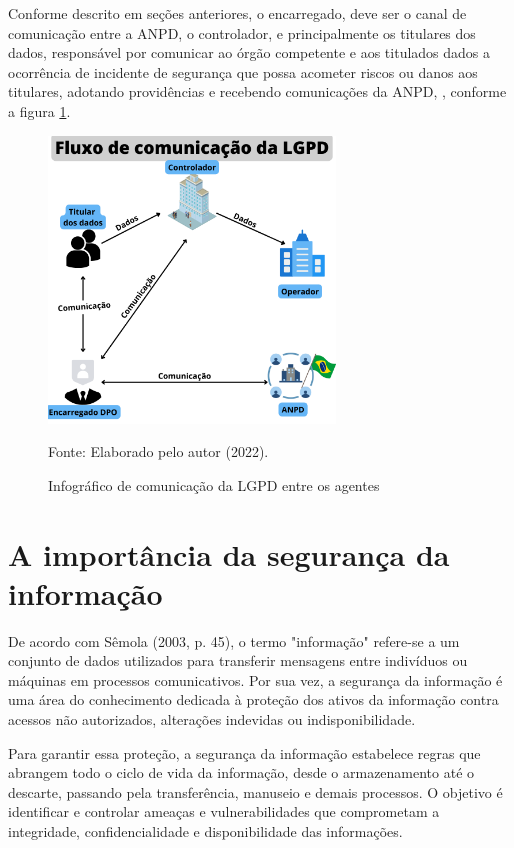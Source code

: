 \documentclass[
	12pt,				%
	openright,			%
	oneside,			%
	a4paper,			%
	english,			%
	french,				%
	spanish,			%
	brazil,				%
	]{abntex2}
\begin{document}
Conforme descrito em seções anteriores, o encarregado, deve ser o canal de comunicação entre a ANPD, o controlador, e principalmente os titulares dos dados, responsável por comunicar ao órgão competente e aos titulados dados a ocorrência de incidente de segurança que possa acometer riscos ou danos aos titulares, adotando providências e recebendo comunicações da ANPD, \cite{LGPD12Mag2020}, conforme a figura \ref{fig: Fluxo }.
\begin{figure}[ht]
    \centering
    \caption{Infográfico de comunicação da LGPD entre os agentes}
    \includegraphics[width=3.0in]{Images/04FluxoLGPD.png}
    
    \label{fig: Fluxo }
    \centering \small Fonte: Elaborado pelo autor (2022).
\end{figure}


\section{A importância da segurança da informação }

De acordo com Sêmola (2003, p. 45), o termo "informação" refere-se a um conjunto de dados utilizados para transferir mensagens entre indivíduos ou máquinas em processos comunicativos. Por sua vez, a segurança da informação é uma área do conhecimento dedicada à proteção dos ativos da informação contra acessos não autorizados, alterações indevidas ou indisponibilidade.

Para garantir essa proteção, a segurança da informação estabelece regras que abrangem todo o ciclo de vida da informação, desde o armazenamento até o descarte, passando pela transferência, manuseio e demais processos. O objetivo é identificar e controlar ameaças e vulnerabilidades que comprometam a integridade, confidencialidade e disponibilidade das informações.
\end{document}
